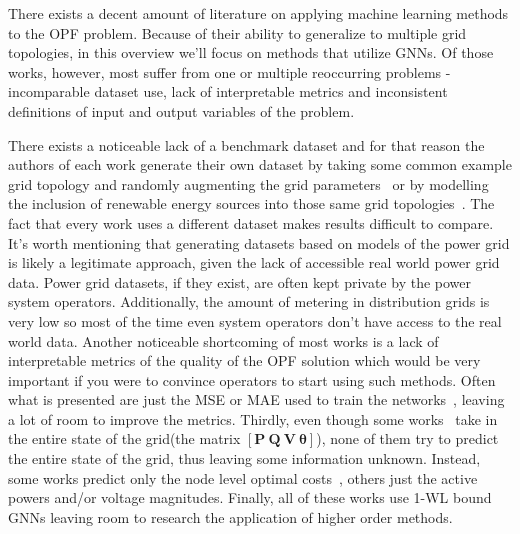 There exists a decent amount of literature on applying machine learning methods to the OPF problem.
Because of their ability to generalize to multiple grid topologies, in this overview we'll focus on
methods that utilize GNNs. Of those works, however, most suffer from one or multiple reoccurring problems -
incomparable dataset use, lack of interpretable metrics and inconsistent definitions of input and output
variables of the problem.

There exists a noticeable lack of a benchmark dataset and for that reason the authors
of each work generate their own dataset by taking some common example grid topology
and randomly augmenting the grid
parameters~\cite{liu2022topology, liu2021graph, yang2022ac, owerko2020optimal, owerko2022unsupervised}
or by modelling the inclusion of renewable energy sources into those same grid
topologies~\cite{surani2023graph, gao2023physics}.
The fact that every work uses a different dataset makes results difficult to compare.
It's worth mentioning that generating datasets based on models of the power grid is likely a legitimate approach, given the lack of accessible real world power grid data.
Power grid datasets, if they exist, are often kept private by the power system operators.
Additionally, the amount of metering in distribution grids is very low so most of the time even
system operators don't have access to the real world data.
Another noticeable shortcoming of most works is a lack of interpretable metrics of
the quality of the OPF solution which would be very important if you were to convince operators
to start using such methods.
Often what is presented are just the MSE or MAE used to train
the networks~\cite{gao2023physics, liu2022topology, liu2021graph}, leaving a lot of room to improve the metrics.
Thirdly, even though some works~\cite{owerko2020optimal, owerko2022unsupervised} take
in the entire state of the grid(the matrix $[\boldsymbol{P} \ \boldsymbol{Q} \ \boldsymbol{V} \ \boldsymbol{\theta}]$),
none of them try to predict the entire state of the grid, thus leaving some information unknown.
Instead, some works predict only the node level optimal costs~\cite{surani2023graph, liu2021graph},
others just the active powers and/or voltage magnitudes.
Finally, all of these works use 1-WL bound GNNs leaving room to research the application of higher order methods.
